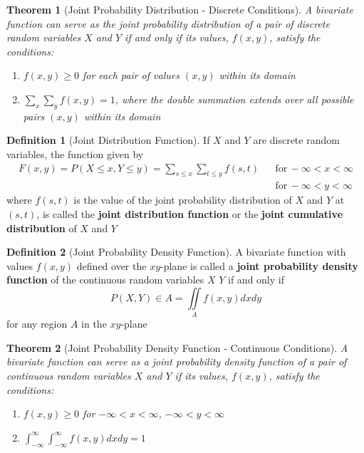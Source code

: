 \documentclass[
10pt,reqno
]{amsart}
\newtheorem{thm}{Theorem}[section]
\theoremstyle{definition}
\newtheorem{definition}{Definition}[section]
\begin{document}
\newpage

\begin{thm}[Joint Probability Distribution - Discrete Conditions]
A bivariate function can serve as the joint probability distribution of a pair of discrete random variables \(X\) and \(Y\) if and only if its values, \(f(x,y)\), satisfy the conditions:
\begin{enumerate}
	\item \(f(x,y) \ge 0\) for each pair of values \((x,y)\) within its domain
	\item \(\sum_x \sum_y f(x,y)=1\), where the double summation extends over all possible pairs \((x,y)\) within its domain
\end{enumerate}
\end{thm}

\begin{definition}[Joint Distribution Function]
If \(X\) and \(Y\) are discrete random variables, the function given by
\begin{align*}
F(x,y)=P(X \leq x, Y \leq y) = \sum_{s \leq x} \sum_{t \leq y} f(s,t) && \text{for} \, - \infty < x < \infty\\
&& \text{for} \, - \infty < y < \infty
\end{align*}
where \(f(s,t)\) is the value of the joint probability distribution of \(X\) and \(Y\) at \((s,t)\), is called the \textbf{joint distribution function} or the \textbf{joint cumulative distribution} of \(X\) and \(Y\)
\end{definition}

\begin{definition}[Joint Probability Density Function]
A bivariate function with values \(f(x,y)\) defined over the \(xy\)-plane is called a \textbf{joint probability density function} of the continuous random variables \(X\) \(Y\) if and only if
\[
P(X,Y) \in A = \underset{A}\iint f(x,y)dxdy
\]
for any region \(A\) in the \(xy\)-plane
\end{definition}

\begin{thm}[Joint Probability Density Function - Continuous Conditions]
A bivariate function can serve as a joint probability density function of a pair of continuous random variables \(X\) and \(Y\) if its values, \(f(x,y)\), satisfy the conditions:
\begin{enumerate}
	\item \(f(x,y) \geq 0\) for \(- \infty < x < \infty \), \(- \infty < y < \infty \)
	\item \(\int^\infty_{-\infty} \int^\infty_{-\infty} f(x,y) dx dy = 1\)
\end{enumerate}
\end{thm}
\end{document}
